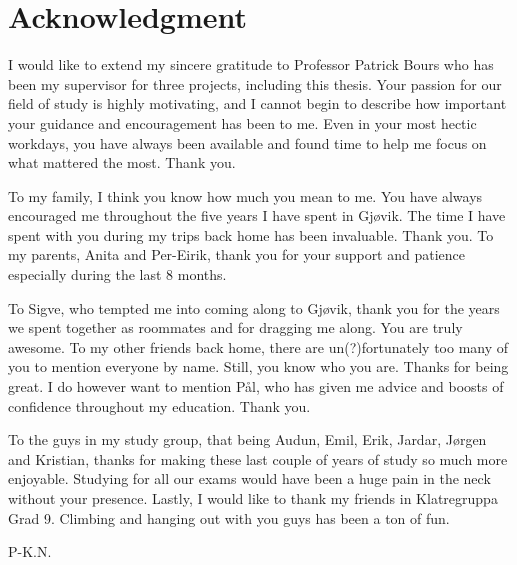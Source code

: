 \chapter*{Acknowledgment}
I would like to extend my sincere gratitude to Professor Patrick Bours who has been my supervisor for three projects, including this thesis. Your passion for our field of study is highly motivating, and I cannot begin to describe how important your guidance and encouragement has been to me. Even in your most hectic workdays, you have always been available and found time to help me focus on what mattered the most. Thank you.

To my family, I think you know how much you mean to me. You have always encouraged me throughout the five years I have spent in Gjøvik. The time I have spent with you during my trips back home has been invaluable. Thank you. To my parents, Anita and Per-Eirik, thank you for your support and patience especially during the last 8 months.

To Sigve, who tempted me into coming along to Gjøvik, thank you for the years we spent together as roommates and for dragging me along. You are truly awesome. To my other friends back home, there are un(?)fortunately too many of you to mention everyone by name. Still, you know who you are. Thanks for being great. I do however want to mention Pål, who has given me advice and boosts of confidence throughout my education. Thank you.

To the guys in my study group, that being Audun, Emil, Erik, Jardar, Jørgen and Kristian, thanks for making these last couple of years of study so much more enjoyable. Studying for all our exams would have been a huge pain in the neck without your presence. Lastly, I would like to thank my friends in Klatregruppa Grad 9. Climbing and hanging out with you guys has been a ton of fun. 

\begin{flushright}
P-K.N.\\[1pc]
\end{flushright}